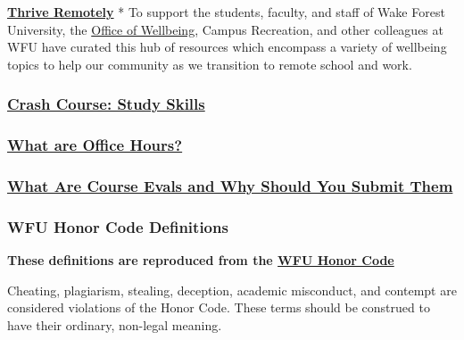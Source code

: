 \textbf{\href{https://thrive.wfu.edu/thrive-remotely-2/}{Thrive Remotely}}
* To support the students, faculty, and staff of Wake Forest University, the \href{https://thrive.wfu.edu/}{Office of Wellbeing}, Campus Recreation, and other colleagues at WFU have curated this hub of resources which encompass a variety of wellbeing topics to help our community as we transition to remote school and work.

\hypertarget{crash-course-study-skills}{%
\subsubsection{\texorpdfstring{\href{https://www.youtube.com/watch?v=E7CwqNHn_Ns\&list=PL8dPuuaLjXtNcAJRf3bE1IJU6nMfHj86W}{Crash Course: Study Skills}}{Crash Course: Study Skills}}\label{crash-course-study-skills}}

\hypertarget{what-are-office-hours}{%
\subsubsection{\texorpdfstring{\href{https://vimeo.com/270014784?embedded=true\&source=vimeo_logo\&owner=2248721}{What are Office Hours?}}{What are Office Hours?}}\label{what-are-office-hours}}

\hypertarget{what-are-course-evals-and-why-should-you-submit-them}{%
\subsubsection{\texorpdfstring{\href{https://www.youtube.com/watch?v=5zkAOpx8Qk8}{What Are Course Evals and Why Should You Submit Them}}{What Are Course Evals and Why Should You Submit Them}}\label{what-are-course-evals-and-why-should-you-submit-them}}

\hypertarget{wfu-honor-code-definitions}{%
\subsubsection{WFU Honor Code Definitions}\label{wfu-honor-code-definitions}}

\textbf{These definitions are reproduced from the \href{https://studentconduct.wfu.edu/procedures-of-the-honor-and-ethics-council/}{WFU Honor Code}}

Cheating, plagiarism, stealing, deception, academic misconduct, and contempt are considered violations of the Honor Code. These terms should be construed to have their ordinary, non-legal meaning.

